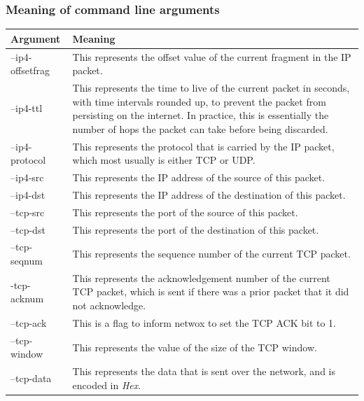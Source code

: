 \documentclass[12pt]{article}
\begin{document}
\subsubsection{Meaning of command line arguments}
\begin{table}[here]
\centering
\begin{tabularx}{0.7\textwidth}{ | l | X | }
\hline
Argument			&	Meaning \\
\hline
--ip4-offsetfrag	& 	This represents the offset value of the current fragment in the IP packet. \\
\hline
--ip4-ttl			&	This represents the time to live of the current packet in seconds, with time intervals rounded up, to prevent the packet from persisting on the internet. In practice, this is essentially the number of hops the packet can take before being discarded. \\
\hline
--ip4-protocol		&	This represents the protocol that is carried by the IP packet, which most usually is either TCP or UDP. \\
\hline
--ip4-src			& 	This represents the IP address of the source of this packet. \\
\hline
--ip4-dst			& 	This represents the IP address of the destination of this packet. \\
\hline
--tcp-src			&	This represents the port of the source of this packet. \\
\hline
--tcp-dst			& 	This represents the port of the destination of this packet. \\
\hline
--tcp-seqnum		&	This represents the sequence number of the current TCP packet. \\
\hline
-tcp-acknum			& 	This represents the acknowledgement number of the current TCP packet, which is sent if there was a prior packet that it did not acknowledge. \\
\hline
--tcp-ack 			& 	This is a flag to inform netwox to set the TCP ACK bit to 1. \\
\hline
--tcp-window		& 	This represents the value of the size of the TCP window. \\
\hline
--tcp-data			& 	This represents the data that is sent over the network, and is encoded in \emph{Hex}. \\
\hline
\end{tabularx}
\end{table}
\end{document}
